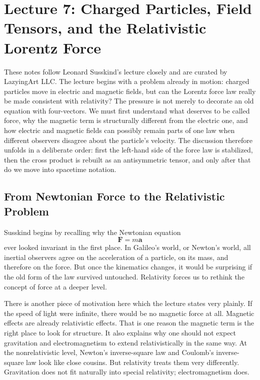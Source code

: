 \chapter{Lecture 7: Charged Particles, Field Tensors, and the Relativistic Lorentz Force}

These notes follow Leonard Susskind's lecture closely and are curated by LazyingArt LLC. The lecture begins with a problem already in motion: charged particles move in electric and magnetic fields, but can the Lorentz force law really be made consistent with relativity? The pressure is not merely to decorate an old equation with four-vectors. We must first understand what deserves to be called force, why the magnetic term is structurally different from the electric one, and how electric and magnetic fields can possibly remain parts of one law when different observers disagree about the particle's velocity. The discussion therefore unfolds in a deliberate order: first the left-hand side of the force law is stabilized, then the cross product is rebuilt as an antisymmetric tensor, and only after that do we move into spacetime notation.

\section{From Newtonian Force to the Relativistic Problem}

Susskind begins by recalling why the Newtonian equation
\begin{equation}
\mathbf F=m\mathbf a
\end{equation}
ever looked invariant in the first place. In Galileo's world, or Newton's world, all inertial observers agree on the acceleration of a particle, on its mass, and therefore on the force. But once the kinematics changes, it would be surprising if the old form of the law survived untouched. Relativity forces us to rethink the concept of force at a deeper level.

There is another piece of motivation here which the lecture states very plainly. If the speed of light were infinite, there would be no magnetic force at all. Magnetic effects are already relativistic effects. That is one reason the magnetic term is the right place to look for structure. It also explains why one should not expect gravitation and electromagnetism to extend relativistically in the same way. At the nonrelativistic level, Newton's inverse-square law and Coulomb's inverse-square law look like close cousins. But relativity treats them very differently. Gravitation does not fit naturally into special relativity; electromagnetism does.

